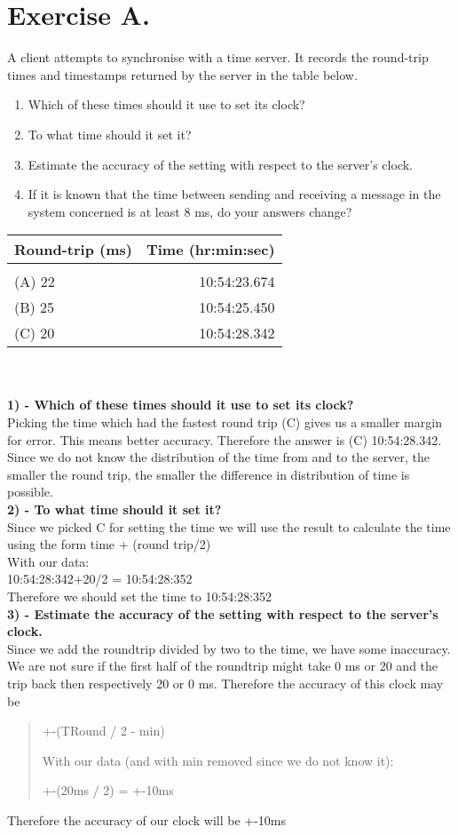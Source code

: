 \section{Exercise A.}
A client attempts to synchronise with a time server. It records the round-trip times and timestamps returned by the server in the table below.
\begin{enumerate}
\item Which of these times should it use to set its clock? 
\item To what time should it set it? 
\item Estimate the accuracy of the setting with respect to the server’s clock. 
\item If it is known that the time between sending and receiving a message in the system concerned is at least 8 ms, do your answers change?
\end{enumerate}
\begin{tabular}{ l | r }
Round-trip (ms) & Time (hr:min:sec) \\[0.1cm]
\hline \\
(A) 22 & 10:54:23.674 \\[0.1cm]
(B) 25 & 10:54:25.450 \\[0.1cm]
(C) 20 & 10:54:28.342 \\[0.1cm]
\hline 
\end{tabular}\\\\

\textbf{1) - Which of these times should it use to set its clock?}\\
Picking the time which had the fastest round trip (C) gives us a smaller margin for error. This means better accuracy. Therefore the answer is (C) 10:54:28.342. Since we do not know the distribution of the time from and to the server, the smaller the round trip, the smaller the difference in distribution of time is possible.\\

\textbf{2) - To what time should it set it?}\\
Since we picked C for setting the time we will use the result to calculate the time using the form
time + (round trip/2)\\
With our data:\\
10:54:28:342+20/2 = 10:54:28:352\\
Therefore we should set the time to 10:54:28:352\\

\textbf{3) - Estimate the accuracy of the setting with respect to the server’s clock.}\\
Since we add the roundtrip divided by two to the time, we have some inaccuracy. We are not sure if the first half of the roundtrip might take 0 ms or 20 and the trip back then respectively 20 or 0 ms. Therefore the accuracy of this clock may be 
\begin{quote}
+-(TRound / 2 - min)

With our data (and with min removed since we do not know it):

+-(20ms / 2) = +-10ms
\end{quote}
Therefore the accuracy of our clock will be +-10ms\\

